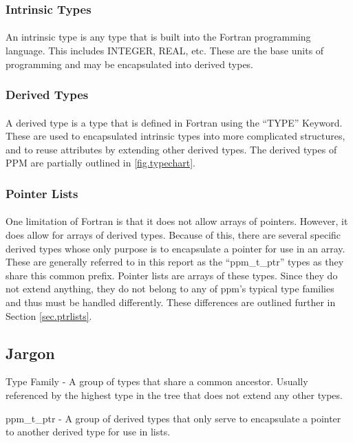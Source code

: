 \documentclass{article}
\begin{document}
\subsubsection{Intrinsic Types}
\paragraph{}
An intrinsic type is any type that is built into the Fortran programming language. This includes INTEGER, REAL, etc. These are the base units of programming and may be encapsulated into derived types.

\subsubsection{Derived Types}
\paragraph{}
A derived type is a type that is defined in Fortran using the ``TYPE'' Keyword. These are used to encapsulated intrinsic types into more complicated structures, and to reuse attributes by extending other derived types. The derived types of PPM are partially outlined in \ref{fig.typechart}.

\subsubsection{Pointer Lists}
\paragraph{}
One limitation of Fortran is that it does not allow arrays of pointers. However, it does allow for arrays of derived types. Because of this, there are several specific derived types whose only purpose is to encapsulate a pointer for use in an array. These are generally referred to in this report as the ``ppm\_t\_ptr'' types as they share this common prefix. Pointer lists are arrays of these types. Since they do not extend anything, they do not belong to any of ppm's typical type families and thus must be handled differently. These differences are outlined further in Section \ref{sec.ptrlists}.

\subsection{Jargon}
\begin{list}{}{}
\item Type Family - A group of types that share a common ancestor. Usually referenced by the highest type in the tree that does not extend any other types.
\item ppm\_t\_ptr - A group of derived types that only serve to encapsulate a pointer to another derived type for use in lists.
\end{list}
\end{document}
